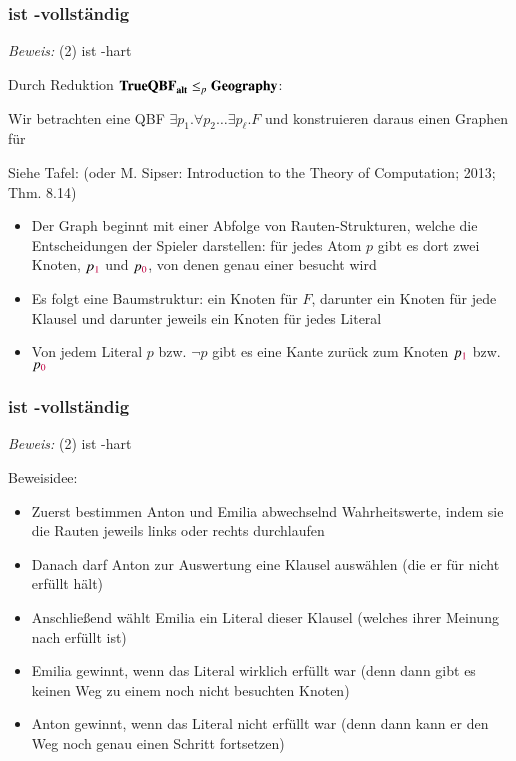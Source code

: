 \documentclass[onlymath]{beamer}
\begin{document}
\begin{frame}[t]\frametitle{ ist \PSpace-vollständig }

\vspace{-1ex}
\pause

\emph{Beweis:} (2)  ist \PSpace-hart\pause
\smallskip

Durch Reduktion $\textbf{\textcolor{black}{TrueQBF}}_{\textbf{\textcolor{black}{alt}}}\leq_p \textbf{\textcolor{black}{Geography}}$:

Wir betrachten eine QBF $\exists p_1.\forall p_2\ldots \exists p_\ell. F$
und konstruieren daraus einen Graphen für  \bigskip

\alert{Siehe Tafel:} {\tiny (oder M. Sipser: Introduction to the Theory of Computation; 2013; Thm. 8.14)}
\begin{itemize}
\item Der Graph beginnt mit einer Abfolge von Rauten-Strukturen, welche die 
Entscheidungen der Spieler darstellen: für jedes Atom $p$ gibt es dort zwei Knoten, $p_{\textcolor{purple}{1}}$ und $p_{\textcolor{purple}{0}}$, von denen genau einer besucht wird
\item Es folgt eine Baumstruktur: ein Knoten für $F$, darunter ein Knoten für jede Klausel und darunter jeweils ein Knoten für jedes Literal
\item Von jedem Literal $p$ bzw. $\neg p$ gibt es eine Kante zurück zum Knoten $p_{\textcolor{purple}{1}}$ bzw. $p_{\textcolor{purple}{0}}$
\end{itemize}


\end{frame}

\begin{frame}[t]\frametitle{ ist \PSpace-vollständig }

\vspace{-1ex}

\emph{Beweis:} (2)  ist \PSpace-hart
\smallskip

Beweisidee:
\begin{itemize}
\item Zuerst bestimmen Anton und Emilia abwechselnd Wahrheitswerte, indem sie die Rauten
jeweils links oder rechts durchlaufen
\item Danach darf Anton zur Auswertung eine Klausel auswählen (die er für nicht erfüllt hält)
\item Anschließend wählt Emilia ein Literal dieser Klausel (welches ihrer Meinung nach erfüllt ist)
\item Emilia gewinnt, wenn das Literal wirklich erfüllt war (denn dann gibt es keinen Weg zu einem noch nicht besuchten Knoten)
\item Anton gewinnt, wenn das Literal nicht erfüllt war (denn dann kann er den Weg noch genau einen Schritt fortsetzen)
\end{itemize}

\end{frame}
\end{document}
